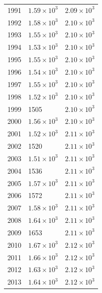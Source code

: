 \begin{table}[H]
\begin{tabular}{lll}
1991 & $\displaystyle 1.59 \times 10^{3}$ & $\displaystyle 2.09 \times 10^{3}$ \\
1992 & $\displaystyle 1.58 \times 10^{3}$ & $\displaystyle 2.10 \times 10^{3}$ \\
1993 & $\displaystyle 1.55 \times 10^{3}$ & $\displaystyle 2.10 \times 10^{3}$ \\
1994 & $\displaystyle 1.53 \times 10^{3}$ & $\displaystyle 2.10 \times 10^{3}$ \\
1995 & $\displaystyle 1.55 \times 10^{3}$ & $\displaystyle 2.10 \times 10^{3}$ \\
1996 & $\displaystyle 1.54 \times 10^{3}$ & $\displaystyle 2.10 \times 10^{3}$ \\
1997 & $\displaystyle 1.55 \times 10^{3}$ & $\displaystyle 2.10 \times 10^{3}$ \\
1998 & $\displaystyle 1.52 \times 10^{3}$ & $\displaystyle 2.10 \times 10^{3}$ \\
1999 & 1505 & $\displaystyle 2.10 \times 10^{3}$ \\
2000 & $\displaystyle 1.56 \times 10^{3}$ & $\displaystyle 2.10 \times 10^{3}$ \\
2001 & $\displaystyle 1.52 \times 10^{3}$ & $\displaystyle 2.11 \times 10^{3}$ \\
2002 & 1520 & $\displaystyle 2.11 \times 10^{3}$ \\
2003 & $\displaystyle 1.51 \times 10^{3}$ & $\displaystyle 2.11 \times 10^{3}$ \\
2004 & 1536 & $\displaystyle 2.11 \times 10^{3}$ \\
2005 & $\displaystyle 1.57 \times 10^{3}$ & $\displaystyle 2.11 \times 10^{3}$ \\
2006 & 1572 & $\displaystyle 2.11 \times 10^{3}$ \\
2007 & $\displaystyle 1.58 \times 10^{3}$ & $\displaystyle 2.11 \times 10^{3}$ \\
2008 & $\displaystyle 1.64 \times 10^{3}$ & $\displaystyle 2.11 \times 10^{3}$ \\
2009 & 1653 & $\displaystyle 2.11 \times 10^{3}$ \\
2010 & $\displaystyle 1.67 \times 10^{3}$ & $\displaystyle 2.12 \times 10^{3}$ \\
2011 & $\displaystyle 1.66 \times 10^{3}$ & $\displaystyle 2.12 \times 10^{3}$ \\
2012 & $\displaystyle 1.63 \times 10^{3}$ & $\displaystyle 2.12 \times 10^{3}$ \\
2013 & $\displaystyle 1.64 \times 10^{3}$ & $\displaystyle 2.12 \times 10^{3}$ \\

\end{tabular}
\end{table}
